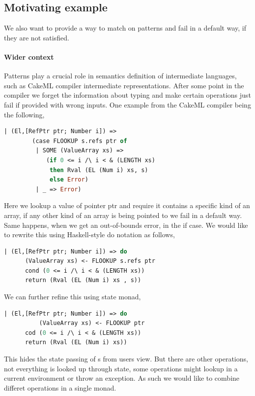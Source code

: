 \documentclass[10pt]{article}
\theoremstyle{definition}
\theoremstyle{remark}
\begin{document}
%

\subsection{Motivating example}

We also want to provide a way to match on
patterns and fail in a default way, if they are not
satisfied.

\paragraph{Wider context}

Patterns play a crucial role in semantics definition of intermediate
languages, such as CakeML compiler intermediate representations.
After some point in the compiler we forget the information about typing
and make certain operations just fail if provided with wrong inputs.
One example from the CakeML compiler being the following,
%
\begin{lstlisting}[language=Caml,basicstyle=\ttfamily\small]
      | (El,[RefPtr ptr; Number i]) =>
        (case FLOOKUP s.refs ptr of
         | SOME (ValueArray xs) =>
            (if 0 <= i /\ i < & (LENGTH xs)
             then Rval (EL (Num i) xs, s)
             else Error)
         | _ => Error)
\end{lstlisting}
%
Here we lookup a value of pointer ptr and require it contains a specific kind of an array, if any other kind of an array is being pointed to we fail in a default way.
Same happens, when we get an out-of-bounds error, in the if case.
We would like to rewrite this using Haskell-style do notation as follows,
%
\begin{lstlisting}[language=Caml,basicstyle=\ttfamily\small]
	| (El,[RefPtr ptr; Number i]) => do
  	  (ValueArray xs) <- FLOOKUP s.refs ptr
	  cond (0 <= i /\ i < & (LENGTH xs))
	  return (Rval (EL (Num i) xs , s))
\end{lstlisting}
%

We can further refine this using state monad,
%
\begin{lstlisting}[language=Caml,basicstyle=\ttfamily\small]
      | (El,[RefPtr ptr; Number i]) => do
      	  (ValueArray xs) <- FLOOKUP ptr
	  cod (0 <= i /\ i < & (LENGTH xs))
	  return (Rval (EL (Num i) xs))
\end{lstlisting}
%
This hides the state passing of s from users view. But there are other operations, not everything is looked up through state, some operations might lookup in a current environment or throw an exception. As such we would like to combine differet operations in a single monad.
\end{document}

